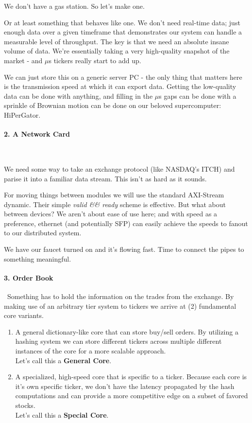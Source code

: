 \documentclass[12pt]{article}
\begin{document}
We don't have a gas station. So let's make one.

Or at least something that behaves like one. We don't need real-time data; just enough data over a given timeframe that demonstrates our system can handle a measurable level of throughput. The key is that we need an absolute insane volume of data. We're essentially taking a very high-quality snapshot of the market - and $\mu$s tickers really start to add up.

We can just store this on a generic server PC - the only thing that matters here is the transmission speed at which it can export data. 
Getting the low-quality data can be done with anything, and filling in the $\mu$s gaps can be done with a sprinkle of Brownian motion can be done on our
beloved supercomputer: HiPerGator.

\paragraph {2. A Network Card}\

We need some way to take an exchange protocol (like NASDAQ's ITCH) and parise it into a familiar data stream. This isn't as hard as it sounds.

For moving things between modules we will use the standard AXI-Stream dynamic. Their simple \emph{valid \&\& ready} scheme is effective.
But what about between devices? 
We aren't about ease of use here; and with speed as a preference, ethernet (and potentially SFP) can
easily achieve the speeds to fanout to our distributed system.

We have our faucet turned on and it's flowing fast. Time to connect the pipes to something meaningful.

\paragraph {3. Order Book}\ 
Something has to hold the information on the trades from the exchange.
By making use of an arbitrary tier system to tickers we arrive at (2) fundamental core variants.

\begin{enumerate}
  \item 
A general dictionary-like core that can store buy/sell orders. 
By utilizing a hashing system we can store different tickers across multiple 
different instances of the core for a more scalable approach.\\
Let's call this a \textbf{General Core}.

  \item 
A specialized, high-speed core that is specific to a ticker. 
Because each core is it's own specific ticker, we don't have the latency 
propagated by the hash computations and can provide a more competitive edge on a subset of favored stocks.\\
Let's call this a \textbf{Special Core}.

\end{enumerate}
\end{document}
